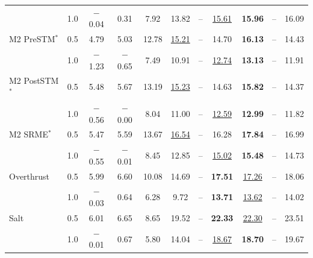 \begin{table}[!t]
\begin{tabular}{llccccccccc}
 & 1.0 & $-$0.04 & 0.31 & 7.92 & 13.82 & -- & \underline{15.61} & \textbf{15.96} & -- & 16.09 \\
M2 PreSTM$^\ast$ & 0.5 & 4.79 & 5.03 & 12.78 & \underline{15.21} & -- & 14.70 & \textbf{16.13} & -- & 14.43 \\
 & 1.0 & $-$1.23 & $-$0.65 & 7.49 & 10.91 & -- & \underline{12.74} & \textbf{13.13} & -- & 11.91 \\
M2 PostSTM$^\ast$ & 0.5 & 5.48 & 5.67 & 13.19 & \underline{15.23} & -- & 14.63 & \textbf{15.82} & -- & 14.37 \\
 & 1.0 & $-$0.56 & $-$0.00 & 8.04 & 11.00 & -- & \underline{12.59} & \textbf{12.99} & -- & 11.82 \\
M2 SRME$^\ast$ & 0.5 & 5.47 & 5.59 & 13.67 & \underline{16.54} & -- & 16.28 & \textbf{17.84} & -- & 16.99 \\
 & 1.0 & $-$0.55 & $-$0.01 & 8.45 & 12.85 & -- & \underline{15.02} & \textbf{15.48} & -- & 14.73 \\
Overthrust & 0.5 & 5.99 & 6.60 & 10.08 & 14.69 & -- & \textbf{17.51} & \underline{17.26} & -- & 18.06 \\
 & 1.0 & $-$0.03 & 0.64 & 6.28 & 9.72 & -- & \textbf{13.71} & \underline{13.62} & -- & 14.02 \\
Salt & 0.5 & 6.01 & 6.65 & 8.65 & 19.52 & -- & \textbf{22.33} & \underline{22.30} & -- & 23.51 \\
 & 1.0 & $-$0.01 & 0.67 & 5.80 & 14.04 & -- & \underline{18.67} & \textbf{18.70} & -- & 19.67 \\
\bottomrule
\end{tabular}
\end{table}

